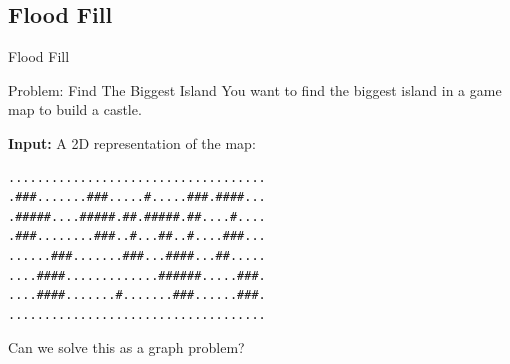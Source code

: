 \subsection{Flood Fill}

\begin{frame}[fragile]{Flood Fill}
  \begin{block}{Problem: Find The Biggest Island}
    You want to find the biggest island in a game map to build a castle.

    {\bf Input:} A 2D representation of the map:
\begin{verbatim}
....................................
.###.......###.....#.....###.####...
.#####....#####.##.#####.##....#....
.###........###..#...##..#....###...
......###.......###...####...##.....
....####.............######.....###.
....####.......#.......###......###.
....................................
\end{verbatim}
  \end{block}
  \hfill Can we solve this as a graph problem?
\end{frame}

